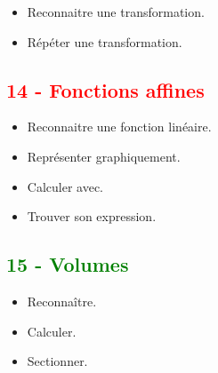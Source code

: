 \documentclass[11pt]{article}
\begin{document}
\begin{multicols}{2}
\begin{itemize}
\item Reconnaitre une transformation.
\item Répéter une transformation.
\end{itemize}

\subsection*{\textcolor{red}{14 - Fonctions affines}}

\begin{itemize}
\item Reconnaitre une fonction linéaire.
\item Représenter graphiquement. 
\item Calculer avec.
\item Trouver son expression.
\end{itemize}

\subsection*{\textcolor{green}{15 - Volumes}}

\begin{itemize}
\item Reconnaître.
\item Calculer.
\item Sectionner.
\end{itemize}

\end{multicols}
\end{document}
